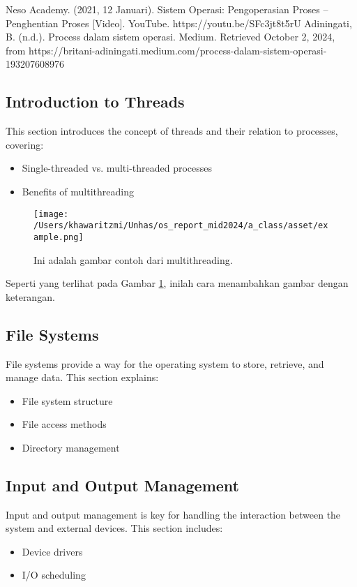 \documentclass[12pt]{article}
\begin{document}
\begin{thebibliography}{99}
    Neso Academy. (2021, 12 Januari). Sistem Operasi: Pengoperasian Proses – Penghentian Proses [Video]. YouTube. https://youtu.be/SFc3jt8t5rU
    Adiningati, B. (n.d.). Process dalam sistem operasi. Medium. Retrieved October 2, 2024, from https://britani-adiningati.medium.com/process-dalam-sistem-operasi-193207608976
\end{thebibliography}

\subsection{Introduction to Threads}
This section introduces the concept of threads and their relation to processes, covering:
\begin{itemize}
    \item Single-threaded vs. multi-threaded processes
    \item Benefits of multithreading
\end{itemize}

\begin{figure}[h]
    \centering
    \texttt{[image: /Users/khawaritzmi/Unhas/os\_report\_mid2024/a\_class/asset/example.png]}  %
    \caption{Ini adalah gambar contoh dari multithreading.}
    \label{fig:contoh_gambar}
\end{figure}

Seperti yang terlihat pada Gambar \ref{fig:contoh_gambar}, inilah cara menambahkan gambar dengan keterangan.

\subsection{File Systems}
File systems provide a way for the operating system to store, retrieve, and manage data. This section explains:
\begin{itemize}
    \item File system structure
    \item File access methods
    \item Directory management
\end{itemize}

\subsection{Input and Output Management}
Input and output management is key for handling the interaction between the system and external devices. This section includes:
\begin{itemize}
    \item Device drivers
    \item I/O scheduling
\end{itemize}
\end{document}
